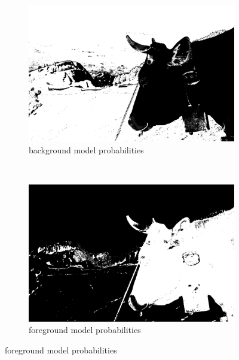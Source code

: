 \documentclass[a4paper]{article}
\begin{document}
\begin{figure}[ht]
	\vspace{2mm}
	\begin{subfigure}[h]{0.48\textwidth}
	\centering
	\includegraphics[width=\textwidth]{imgs/backgroundProb.png}
	\caption*{background model probabilities}
	\end{subfigure}
	~
	\begin{subfigure}[h]{0.48\textwidth}
	\centering
	\includegraphics[width=\textwidth]{imgs/foregroundProb.png}
	\caption*{foreground model probabilities}
	\end{subfigure}
		


\end{figure}
\end{document}
